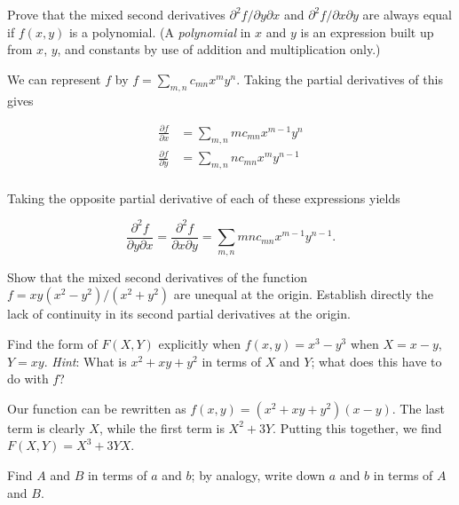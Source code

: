 \documentclass[../the-road-to-reality.tex]{subfiles}
\begin{document}
\begin{questions}
\question Prove that the mixed second derivatives $\partial^2f/\partial{y}\partial{x}$ and $\partial^2f/\partial{x}\partial{y}$ are always equal if $f(x, y)$ is a polynomial. (A \textit{polynomial} in $x$ and $y$ is an expression built up from $x$, $y$, and constants by use of addition and multiplication only.)

\begin{solution}
        We can represent $f$ by $f = \sum_{m,n}c_{mn}x^my^n$. Taking the partial derivatives of this gives

        \begin{align*}
                \frac{\partial{f}}{\partial{x}} &= \sum_{m,n}mc_{mn}x^{m-1}y^n \\
                \frac{\partial{f}}{\partial{y}} &= \sum_{m,n}nc_{mn}x^my^{n-1} \\
        \end{align*}

        Taking the opposite partial derivative of each of these expressions yields

	\[
        \frac{\partial^2f}{\partial{y}\partial{x}} = \frac{\partial^2f}{\partial{x}\partial{y}} = \sum_{m,n}mnc_{mn}x^{m-1}y^{n-1}
	.\] 
\end{solution}

\question Show that the mixed second derivatives of the function $f = xy(x^2 - y^2)/(x^2 + y^2)$ are unequal at the origin. Establish directly the lack of continuity in its second partial derivatives at the origin.

\question Find the form of $F(X, Y)$ explicitly when $f(x, y) = x^3 - y^3$ when $X = x-y$, $Y=xy$. \textit{Hint}: What is $x^2 + xy + y^2$ in terms of $X$ and $Y$; what does this have to do with $f$?

\begin{solution}
        Our function can be rewritten as $f(x, y) = (x^2 + xy + y^2)(x - y)$. The last term is clearly $X$, while the first term is $X^2 + 3Y$. Putting this together, we find $F(X,Y) = X^3 + 3YX$.	
\end{solution}

\question Find $A$ and $B$ in terms of $a$ and $b$; by analogy, write down $a$ and $b$ in terms of $A$ and $B$.


\end{questions}
\end{document}
